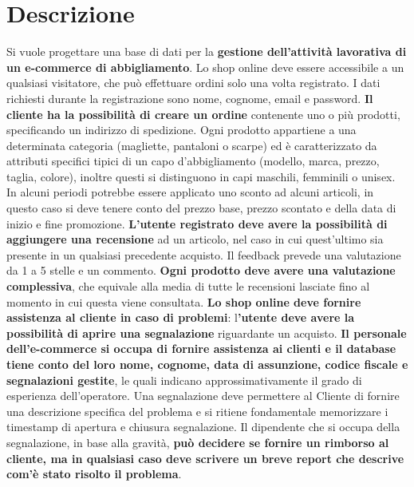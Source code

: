 \section{Descrizione}

Si vuole progettare una base di dati per la\textbf{ gestione dell'attività lavorativa di un e-commerce di abbigliamento}. Lo shop online deve essere accessibile a un qualsiasi visitatore, che può effettuare ordini solo una volta registrato. I dati richiesti durante la registrazione sono nome, cognome, email e password. \textbf{Il cliente ha la possibilità di creare un ordine} contenente uno o più prodotti, specificando un indirizzo di spedizione. Ogni prodotto appartiene a una determinata categoria (magliette, pantaloni o scarpe) ed è caratterizzato da attributi specifici tipici di un capo d'abbigliamento (modello, marca, prezzo, taglia, colore), inoltre questi si distinguono in capi maschili, femminili o unisex. In alcuni periodi potrebbe essere applicato uno sconto ad alcuni articoli, in questo caso si deve tenere conto del prezzo base, prezzo scontato e della data di inizio e fine promozione.
\textbf{L'utente registrato deve avere la possibilità di aggiungere una recensione} ad un articolo, nel caso in cui quest'ultimo sia presente in un qualsiasi precedente acquisto. Il feedback prevede una valutazione da 1 a 5 stelle e un commento. \textbf{Ogni prodotto deve avere una valutazione complessiva}, che equivale alla media di tutte le recensioni lasciate fino al momento in cui questa viene consultata.
\textbf{Lo shop online deve fornire assistenza al cliente in caso di problemi}: l\textbf{'utente deve avere la possibilità di aprire una segnalazione} riguardante un acquisto. \textbf{Il personale dell'e-commerce si occupa di fornire assistenza ai clienti e il database tiene conto del loro nome, cognome, data di assunzione, codice fiscale e segnalazioni gestite}, le quali indicano approssimativamente il grado di esperienza dell'operatore. Una segnalazione deve permettere al Cliente di fornire una descrizione specifica del problema e si ritiene fondamentale memorizzare i timestamp di apertura e chiusura segnalazione. Il dipendente che si occupa della segnalazione, in base alla gravità,\textbf{ può decidere se fornire un rimborso al cliente, ma in qualsiasi caso deve scrivere un breve report che descrive com'è stato risolto il problema}.
\newpage
